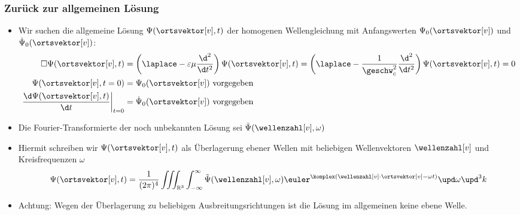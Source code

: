  \begin{frame}
  \frametitle{Zurück zur allgemeinen Lösung}
  \begin{itemize}[<+->]
  \item Wir suchen die \alert{allgemeine Lösung} \(\Psi(\ortsvektor[v],t)\) der \alert{homogenen Wellengleichung} mit \alert{Anfangswerten} \(\Psi_0(\ortsvektor[v])\) und \(\dot{\Psi}_0(\ortsvektor[v])\):
    \begin{align*}
      \square\Psi(\ortsvektor[v],t) &= \left(\laplace - \varepsilon\mu\frac{\d^2}{\d t^2}\right)\Psi(\ortsvektor[v],t) = \left(\laplace - \frac{1}{\geschw_c^2}\frac{\d^2}{\d t^2}\right)\Psi(\ortsvektor[v],t) = 0\\
      \Psi(\ortsvektor[v],t=0) &= \Psi_0(\ortsvektor[v]) \text{ vorgegeben}\\
      \left.\frac{\d \Psi(\ortsvektor[v],t)}{\d t}\right|_{t=0} &= \dot{\Psi}_0(\ortsvektor[v]) \text{ vorgegeben}
    \end{align*}
  \item Die Fourier-Transformierte der noch unbekannten Lösung sei \(\tilde{\Psi}(\wellenzahl[v], \omega)\)
  \item Hiermit schreiben wir \(\Psi(\ortsvektor[v], t)\) als \alert{Überlagerung ebener Wellen} mit beliebigen Wellenvektoren \(\wellenzahl[v]\) und Kreisfrequenzen \(\omega\)
    \begin{equation*}
      \Psi(\ortsvektor[v], t) = \frac{1}{(2\pi)^4} \iiint_{\mathbb{R}^3} \int_{-\infty}^\infty \tilde{\Psi}(\wellenzahl[v], \omega) \euler^{\komplex(\wellenzahl[v]\cdot\ortsvektor[v]-\omega t)} \upd \omega \upd^3k  
    \end{equation*}
    \item Achtung: Wegen der Überlagerung zu beliebigen Ausbreitungsrichtungen ist die Lösung im allgemeinen \alert{keine ebene Welle}.
    \end{itemize}
  \end{frame}

